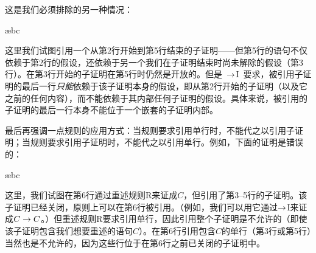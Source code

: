 这是我们必须排除的另一种情况：


\begin{fitchproof}
\PR
\open
	\AS
	\open
	\AS
	\ae{bc}
	\close
\close
\ifHTMLtarget
{}
\else
{}
 
\fi
\end{fitchproof}


这里我们试图引用一个从第2行开始到第5行结束的子证明——但第5行的语句不仅依赖于第2行的假设，还依赖于另一个我们在子证明结束时尚未解除的假设（第3行）。在第3行开始的子证明在第5行时仍然是开放的。但是~$\rightarrow$I~要求，被引用子证明的最后一行\emph{只能}依赖于该子证明本身的假设，即从第2行开始的子证明（以及它之前的任何内容），而不能依赖于其内部任何子证明的假设。具体来说，被引用的子证明的最后一行本身不能位于一个嵌套的子证明内部。


最后再强调一点规则的应用方式：当规则要求引用单行时，不能代之以引用子证明；当规则要求引用子证明时，不能代之以引用单行。例如，下面的证明是错误的：

\begin{fitchproof}
\PR
\open
	\AS
	\open
	\AS
	\ae{bc}
	\close
\ifHTMLtarget
\else
{}
 
\fi
\close
{}
\end{fitchproof}

这里，我们试图在第6行通过重述规则R来证成$C$，但引用了第3–5行的子证明。该子证明已经关闭，原则上可以在第6行被引用。（例如，我们可以用它通过$\rightarrow$I来证成$C \rightarrow C$。）但重述规则R要求引用单行，因此引用整个子证明是不允许的（即使该子证明包含我们想要重述的语句$C$）。在第6行引用包含$C$的单行（第3行或第5行）当然也是不允许的，因为这些行位于在第6行之前已关闭的子证明中。

